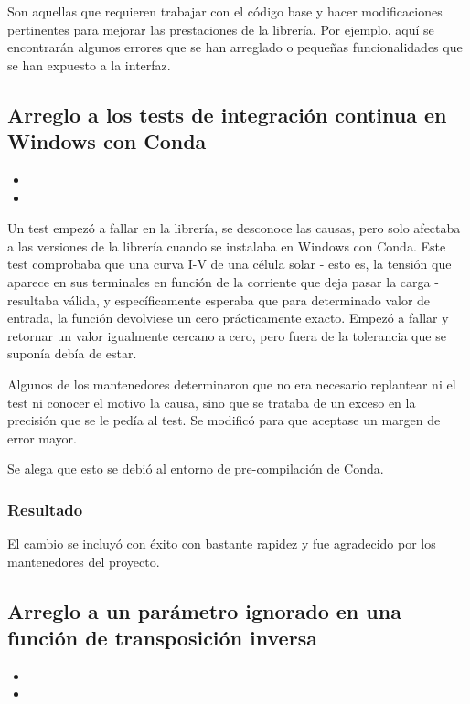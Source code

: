 Son aquellas que requieren trabajar con el código base y hacer modificaciones pertinentes para mejorar las prestaciones de la librería. Por ejemplo, aquí se encontrarán algunos errores que se han arreglado o pequeñas funcionalidades que se han expuesto a la interfaz.

\subsection{Arreglo a los tests de integración continua en Windows con Conda}

\begin{itemize}
    \item {}
    \item {}
\end{itemize}

Un test empezó a fallar en la librería, se desconoce las causas, pero solo afectaba a las versiones de la librería cuando se instalaba en Windows con Conda. Este test comprobaba que una curva I-V de una célula solar - esto es, la tensión que aparece en sus terminales en función de la corriente que deja pasar la carga - resultaba válida, y específicamente esperaba que para determinado valor de entrada, la función devolviese un cero prácticamente exacto. Empezó a fallar y retornar un valor igualmente cercano a cero, pero fuera de la tolerancia que se suponía debía de estar.

Algunos de los mantenedores determinaron que no era necesario replantear ni el test ni conocer el motivo la causa, sino que se trataba de un exceso en la precisión que se le pedía al test. Se modificó para que aceptase un margen de error mayor.

Se alega que esto se debió al entorno de pre-compilación de Conda.

\subsubsection{Resultado}

El cambio se incluyó con éxito con bastante rapidez y fue agradecido por los mantenedores del proyecto.

\subsection{Arreglo a un parámetro ignorado en una función de transposición inversa}

\begin{itemize}
    \item {}
    \item {}
\end{itemize}


